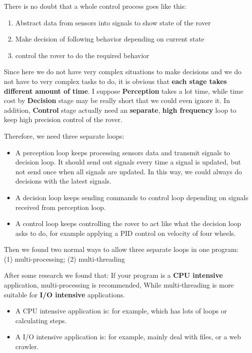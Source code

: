 There is no doubt that a whole control process goes like this:
\begin{enumerate}
    \item Abstract data from sensors into signals to show state of the rover
    \item Make decision of following behavior depending on current state
    \item control the rover to do the required behavior
\end{enumerate}

Since here we do not have very complex situations to make decisions and we do not have to very complex tasks to do, it is obvious that \textbf{each stage takes different amount of time}. I suppose \textbf{Perception} takes a lot time, while time cost by \textbf{Decision} stage may be really short that we could even ignore it. In addition, \textbf{Control} stage actually need an \textbf{separate}, \textbf{high frequency} loop to keep high precision control of the rover.

Therefore, we need three separate loops:
\begin{itemize}
    \item A perception loop keeps processing sensors data and transmit signals to decision loop. It should send out signals every time a signal is updated, but not send once when all signals are updated. In this way, we could always do decisions with the latest signals.
    \item A decision loop keeps sending commands to control loop depending on signals received from perception loop.
    \item A control loop keeps controlling the rover to act like what the decision loop asks to do, for example applying a PID control on velocity of four wheels.
\end{itemize}

Then we found two normal ways to allow three separate loops in one program: (1) multi-processing; (2) multi-threading

After some research we found that: If your program is a \textbf{CPU intensive} application, multi-processing is recommended, While multi-threading is more suitable for \textbf{I/O intensive} applications.

\begin{itemize}
    \item A CPU intensive application is: for example, which has lots of loops or calculating steps.
    \item A I/O intensive application is: for example, mainly deal with files, or a web crawler.
\end{itemize}

